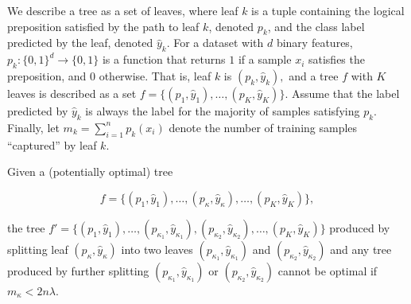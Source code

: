   \begin{theorem}
    \label{thm:a-tree-as-a-set-of-leaves}
  We describe a tree as a set of leaves, where leaf $k$ is a tuple containing the logical preposition satisfied by the path to leaf $k$, denoted $p_k $, and the class label predicted by the leaf, denoted $\hat{y}_k$. For a dataset with $d$ binary features, $p_k: \{0, 1\}^d \to \{0, 1\}$ is a function that returns $1$ if a sample $x_i$ satisfies the preposition, and $0$ otherwise. That is, leaf $k$ is $(p_k, \hat{y}_k),$ and a tree $f$ with $K$ leaves is described as a set $f = \{(p_1, \hat{y}_1), \hdots, (p_K, \hat{y}_K)\}$. Assume that the label predicted by $\hat{y}_k$ is always the label for the majority of samples satisfying $p_k$. Finally, let $m_k = \sum_{i=1}^n p_k(x_i)$ denote the number of training samples ``captured'' by leaf $k$.

  Given a (potentially optimal) tree 

    \begin{equation}
      f = \{(p_1, \hat{y}_1), \hdots, (p_{\kappa}, \hat{y}_{\kappa}), \hdots, (p_K, \hat{y}_K)\},
    \end{equation}

  the tree $f' = \{(p_1, \hat{y}_1), \hdots, (p_{\kappa_1}, \hat{y}_{\kappa_1}), (p_{\kappa_2}, \hat{y}_{\kappa_2}), \hdots, (p_K, \hat{y}_K)\}$ produced by splitting leaf $(p_{\kappa}, \hat{y}_{\kappa})$ into two leaves $(p_{\kappa_1}, \hat{y}_{\kappa_1})$ and $(p_{\kappa_2}, \hat{y}_{\kappa_2})$ and any tree produced by further splitting $(p_{\kappa_1}, \hat{y}_{\kappa_1})$ or $(p_{\kappa_2}, \hat{y}_{\kappa_2})$ cannot  be optimal if $m_{\kappa} < 2n\lambda$.
  \end{theorem}
